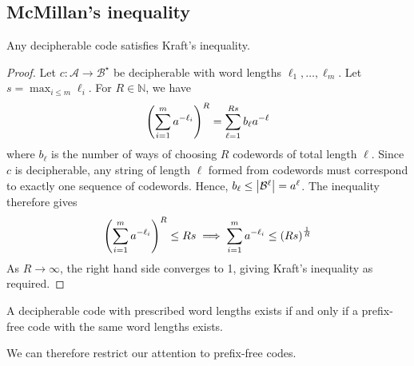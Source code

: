 \subsection{McMillan's inequality}
\begin{theorem}
    Any decipherable code satisfies Kraft's inequality.
\end{theorem}
\begin{proof}
    Let \( c \colon \mathcal A \to \mathcal B^\star \) be decipherable with word lengths \( \ell_1, \dots, \ell_m \).
    Let \( s = \max_{i \leq m} \ell_i \).
    For \( R \in \mathbb N \), we have
    \[ \qty(\sum_{i=1}^m a^{-\ell_i})^R = \sum_{\ell = 1}^{Rs} b_\ell a^{-\ell} \]
    where \( b_\ell \) is the number of ways of choosing \( R \) codewords of total length \( \ell \).
    Since \( c \) is decipherable, any string of length \( \ell \) formed from codewords must correspond to exactly one sequence of codewords.
    Hence, \( b_\ell \leq \abs{\mathcal B^\ell} = a^\ell \).
    The inequality therefore gives
    \[ \qty(\sum_{i=1}^m a^{-\ell_i})^R \leq Rs \implies \sum_{i=1}^m a^{-\ell_i} \leq \qty(Rs)^{\frac{1}{R}} \]
    As \( R \to \infty \), the right hand side converges to 1, giving Kraft's inequality as required.
\end{proof}
\begin{corollary}
    A decipherable code with prescribed word lengths exists if and only if a prefix-free code with the same word lengths exists.
\end{corollary}
We can therefore restrict our attention to prefix-free codes.

